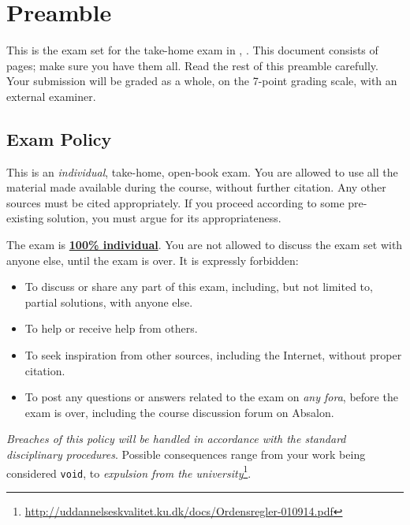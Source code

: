 
\section*{Preamble}

This is the exam set for the take-home exam in \course{}, \period{}.  This
document consists of \pageref{LastPage} pages; make sure you have them all.
Read the rest of this preamble carefully. Your submission will be graded as a
whole, on the 7-point grading scale, with an external examiner. 


\subsection*{Exam Policy}

This is an \emph{individual}, take-home, open-book exam. You are allowed to use
all the material made available during the course, without further citation.
Any other sources must be cited appropriately. If you proceed according to some
pre-existing solution, you must argue for its appropriateness.

The exam is \underline{\textbf{100\% individual}}. You are not allowed to
discuss the exam set with anyone else, until the exam is over.  It is expressly
forbidden:

\begin{itemize}

\item To discuss or share any part of this exam, including, but not limited
to, partial solutions, with anyone else.

\item To help or receive help from others.

\item To seek inspiration from other sources, including the Internet, without
proper citation.

\item To post any questions or answers related to the exam on \emph{any fora},
before the exam is over, including the course discussion forum on Absalon.

\end{itemize}

\emph{Breaches of this policy will be handled in accordance with the standard
disciplinary procedures}. Possible consequences range from your work being
considered \lstinline|void|, to \emph{expulsion from the
university}\footnote{\url{http://uddannelseskvalitet.ku.dk/docs/Ordensregler-010914.pdf}}.

